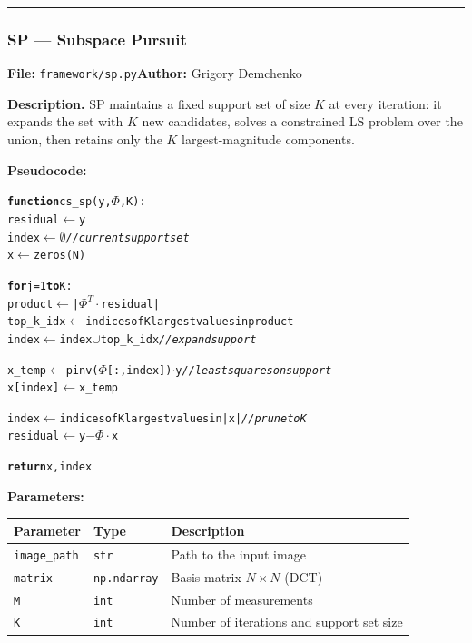 \documentclass[12pt,a4paper]{article}
\newcommand{\cs}[1]{\texttt{#1}}          %
\begin{document}
\bigskip\hrule\bigskip

\subsubsection{SP --- Subspace Pursuit}

\textbf{File:} \cs{framework/sp.py}\quad\textbf{Author:} Grigory Demchenko

\textbf{Description.}  SP maintains a fixed support set of size $K$ at every
iteration: it expands the set with $K$ new candidates, solves a constrained LS
problem over the union, then retains only the $K$ largest-magnitude components.

\textbf{Pseudocode:}

\begin{alltt}
\textbf{function} cs\_sp(y, \(\Phi\), K):
    residual \(\leftarrow\) y
    index    \(\leftarrow\) \(\emptyset\)                       \textit{// current support set}
    x        \(\leftarrow\) zeros(N)

    \textbf{for} j = 1 \textbf{to} K:
        product   \(\leftarrow\) |\(\Phi^T \cdot\) residual|
        top\_k\_idx \(\leftarrow\) indices of K largest values in product
        index     \(\leftarrow\) index \(\cup\) top\_k\_idx      \textit{// expand support}

        x\_temp    \(\leftarrow\) pinv(\(\Phi\)[:, index]) \(\cdot\) y  \textit{// least squares on support}
        x[index]  \(\leftarrow\) x\_temp

        index    \(\leftarrow\) indices of K largest values in |x|  \textit{// prune to K}
        residual \(\leftarrow\) y \(-\) \(\Phi \cdot\) x

    \textbf{return} x, index
\end{alltt}

\textbf{Parameters:}

\begin{center}
\begin{tabular}{lll}
  \toprule
  Parameter        & Type             & Description \\
  \midrule
  \cs{image\_path} & \cs{str}         & Path to the input image \\
  \cs{matrix}      & \cs{np.ndarray}  & Basis matrix $N \times N$ (DCT) \\
  \cs{M}           & \cs{int}         & Number of measurements \\
  \cs{K}           & \cs{int}         & Number of iterations and support set size \\
  \bottomrule
\end{tabular}
\end{center}
\end{document}
